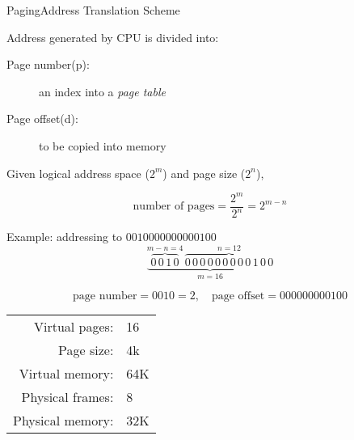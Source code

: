 \begin{frame}{Paging}{Address Translation Scheme}
  \begin{iblock}{Address generated by CPU is divided into:}
    \begin{description}
    \item[Page number(p):] an index into a \emph{page table}
    \item[Page offset(d):] to be copied into memory
    \end{description}
  \end{iblock}
  Given \alert{logical address space} ($2^m$) and \alert{page size} ($2^n$),
  \begin{small}
    $$\text{number of pages}=\frac{2^m}{2^n}=2^{m-n}$$
  \end{small}
  \begin{iblock}{Example: addressing to $0010000000000100$}
    $$\underbrace{\overbrace{0\,0\,1\,0}^{m-n=4}\,\overbrace{0\,0\,0\,0\,0\,0\,0\,0\,0\,1\,0\,0}^{n=12}}_{m=16}$$
    \begin{small}
      $$\text{page number}=0010=2, \quad \text{page offset}=000000000100$$
    \end{small}
  \end{iblock}
\end{frame}

\begin{frame}
  \begin{minipage}{.55\textwidth}
    \centering {}%
    \label{fig:paging}
  \end{minipage}\hfill
  \begin{minipage}{.35\textwidth}
    \begin{tabular}{rl}
      Virtual pages:  &16\\
      Page size:      &4k\\
      Virtual memory:& 64K\\
      Physical frames:&8\\
      Physical memory:&32K
    \end{tabular}
  \end{minipage}
\end{frame}


